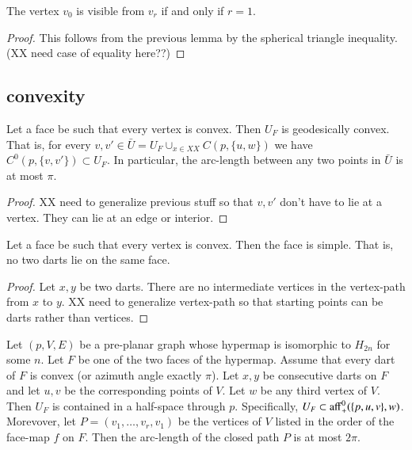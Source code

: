 \begin{lemma}  The vertex $v_0$ is visible from $v_r$ if and
only if $r=1$.
\end{lemma}

\begin{proof}  This follows from the previous lemma by the spherical triangle inequality.
(XX need case of equality here??)
\end{proof}

\subsection{convexity}


\begin{lemma}  Let a face be such that every vertex is convex.  Then $U_F$ is
geodesically convex.  That is, for every $v,v'\in \bar U = U_F\cup_{x\in XX} C(p,\{u,w\})$
we have $C^0(p,\{v,v'\})\subset U_F$.  In particular, the arc-length between any
two points in $\bar U$ is at most $\pi$. 
\end{lemma}

\begin{proof}
XX need to generalize previous stuff so that $v,v'$ don't have to lie at a vertex.
They can lie at an edge or interior.
\end{proof}

\begin{lemma} Let a face be such that every vertex is convex.  Then the face
is simple.  That is, no two darts lie on the same face.
\end{lemma}

\begin{proof} Let $x,y$ be two darts.
There are no intermediate vertices in the vertex-path from $x$ to $y$.
XX need to generalize vertex-path so that starting points can be darts rather than
vertices.
\end{proof}

\begin{lemma}\label{lemma:convex-hyper}  
Let $(p,V,E)$ be a pre-planar graph whose hypermap is isomorphic
to $H_{2n}$ for some $n$.  Let $F$ be one of the two faces of the hypermap.  Assume
that every dart of $F$ is convex (or azimuth angle exactly $\pi$).  Let $x,y$
be consecutive darts on $F$ and let $u,v$ be the corresponding points of $V$.
Let $w$ be any third vertex of $V$.  Then $U_F$
is contained in
a half-space through $p$.  Specifically, $U_F\subset {\operatorname{aff}}_+^0(\{p,u,v\},w)$.
Morevover,
let $P=(v_1,\ldots,v_r,v_1)$ be the vertices of $V$ listed
in the order of the face-map $f$ on $F$.  Then the arc-length of the closed
path $P$ is at most $2\pi$.
\end{lemma}

